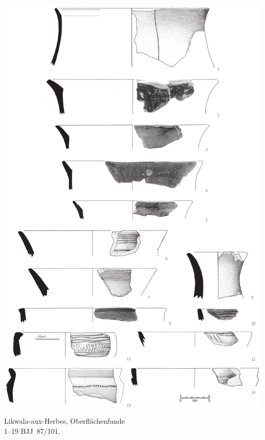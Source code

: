 \begin{pl}[H]
	\includegraphics{plt/Taf77.pdf}
	\vspace{.75em}\caption{Likwala-aux-Herbes, Oberflächenfunde \\ 1--19 BJJ~87/101.}
	\label{pl:77}
\end{pl}

